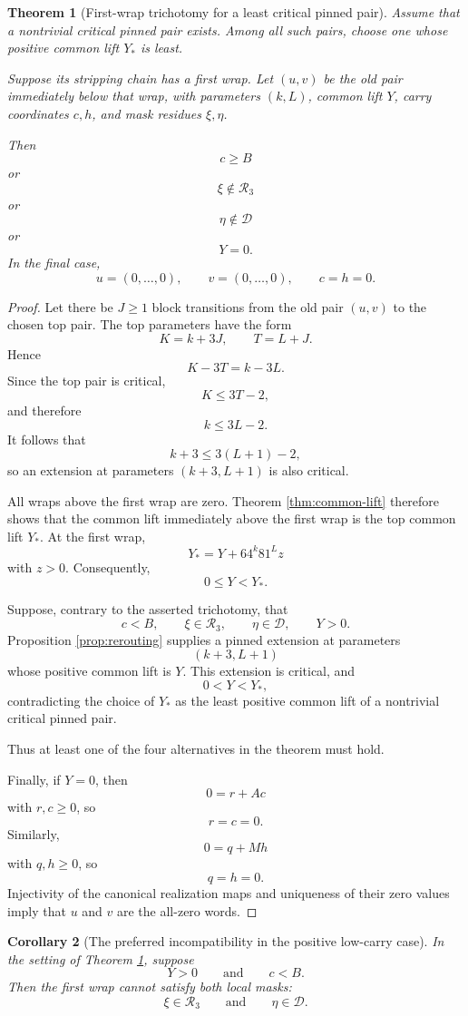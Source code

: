 \documentclass[11pt]{article}
\newtheorem{theorem}{Theorem}[section]
\newtheorem{corollary}[theorem]{Corollary}
\theoremstyle{remark}
\newcommand{\Rset}{\mathcal{R}}
\newcommand{\Dset}{\mathcal{D}}
\begin{document}
\begin{theorem}[First-wrap trichotomy for a least critical pinned pair]
\label{thm:trichotomy}
Assume that a nontrivial critical pinned pair exists.  Among all such pairs, choose one whose positive common lift \(Y_*\) is least.

Suppose its stripping chain has a first wrap.  Let \((u,v)\) be the old pair immediately below that wrap, with parameters \((k,L)\), common lift \(Y\), carry coordinates \(c,h\), and mask residues \(\xi,\eta\).

Then
\[
c\ge B
\]
or
\[
\xi\notin\Rset_3
\]
or
\[
\eta\notin\Dset
\]
or
\[
Y=0.
\]
In the final case,
\[
u=(0,\ldots,0),
\qquad
v=(0,\ldots,0),
\qquad
c=h=0.
\]
\end{theorem}

\begin{proof}
Let there be \(J\ge1\) block transitions from the old pair \((u,v)\) to the chosen top pair.  The top parameters have the form
\[
K=k+3J,
\qquad
T=L+J.
\]
Hence
\[
K-3T=k-3L.
\]
Since the top pair is critical,
\[
K\le3T-2,
\]
and therefore
\[
k\le3L-2.
\]
It follows that
\[
k+3\le3(L+1)-2,
\]
so an extension at parameters \((k+3,L+1)\) is also critical.

All wraps above the first wrap are zero.  Theorem \ref{thm:common-lift} therefore shows that the common lift immediately above the first wrap is the top common lift \(Y_*\).  At the first wrap,
\[
Y_*=Y+64^k81^Lz
\]
with \(z>0\).  Consequently,
\[
0\le Y<Y_*.
\]

Suppose, contrary to the asserted trichotomy, that
\[
c<B,
\qquad
\xi\in\Rset_3,
\qquad
\eta\in\Dset,
\qquad
Y>0.
\]
Proposition \ref{prop:rerouting} supplies a pinned extension at parameters
\[
(k+3,L+1)
\]
whose positive common lift is \(Y\).  This extension is critical, and
\[
0<Y<Y_*,
\]
contradicting the choice of \(Y_*\) as the least positive common lift of a nontrivial critical pinned pair.

Thus at least one of the four alternatives in the theorem must hold.

Finally, if \(Y=0\), then
\[
0=r+Ac
\]
with \(r,c\ge0\), so
\[
r=c=0.
\]
Similarly,
\[
0=q+Mh
\]
with \(q,h\ge0\), so
\[
q=h=0.
\]
Injectivity of the canonical realization maps and uniqueness of their zero values imply that \(u\) and \(v\) are the all-zero words.
\end{proof}

\begin{corollary}[The preferred incompatibility in the positive low-carry case]
\label{cor:preferred}
In the setting of Theorem \ref{thm:trichotomy}, suppose
\[
Y>0
\qquad\text{and}\qquad
c<B.
\]
Then the first wrap cannot satisfy both local masks:
\[
\xi\in\Rset_3
\qquad\text{and}\qquad
\eta\in\Dset.
\]
\end{corollary}
\end{document}
